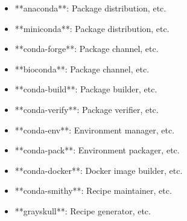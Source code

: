 \documentclass[11pt,a4paper]{article}
\begin{document}
\begin{itemize}
\item **anaconda**: Package distribution, etc.
\end{itemize}

\begin{itemize}
\item **miniconda**: Package distribution, etc.
\end{itemize}

\begin{itemize}
\item **conda-forge**: Package channel, etc.
\end{itemize}

\begin{itemize}
\item **bioconda**: Package channel, etc.
\end{itemize}

\begin{itemize}
\item **conda-build**: Package builder, etc.
\end{itemize}

\begin{itemize}
\item **conda-verify**: Package verifier, etc.
\end{itemize}

\begin{itemize}
\item **conda-env**: Environment manager, etc.
\end{itemize}

\begin{itemize}
\item **conda-pack**: Environment packager, etc.
\end{itemize}

\begin{itemize}
\item **conda-docker**: Docker image builder, etc.
\end{itemize}

\begin{itemize}
\item **conda-smithy**: Recipe maintainer, etc.
\end{itemize}

\begin{itemize}
\item **grayskull**: Recipe generator, etc.
\end{itemize}
\end{document}
